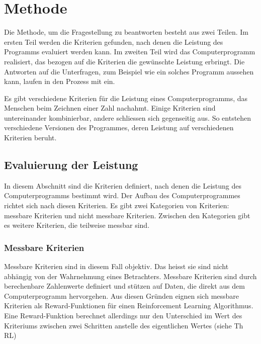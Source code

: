 \chapter{Methode}
Die Methode, um die Fragestellung zu beantworten besteht aus zwei Teilen. Im
ersten Teil werden die Kriterien gefunden, nach denen die Leistung des Programms
evaluiert werden kann. Im zweiten Teil wird das Computerprogramm realisiert, das
bezogen auf die Kriterien die gewünschte Leistung erbringt. Die Antworten auf
die Unterfragen, zum Beispiel wie ein solches Programm aussehen kann, laufen in
den Prozess mit ein. 

Es gibt verschiedene Kriterien für die Leistung eines Computerprogramms, das
Menschen beim Zeichnen einer Zahl nachahmt. Einige Kriterien sind untereinander
kombinierbar, andere schliessen sich gegenseitig aus. So entstehen verschiedene
Versionen des Programmes, deren Leistung auf verschiedenen Kriterien beruht.


\section{Evaluierung der Leistung}
In diesem Abschnitt sind die Kriterien definiert, nach denen die Leistung des
Computerprogramms bestimmt wird. Der Aufbau des Computerprogrammes richtet sich
nach diesen Kriterien. Es gibt zwei Kategorien von Kriterien: messbare Kriterien
und nicht messbare Kriterien. Zwischen den Kategorien gibt es weitere Kriterien,
die teilweise messbar sind.

\subsection*{Messbare Kriterien}
Messbare Kriterien sind in diesem Fall objektiv. Das heisst sie sind nicht
abhängig von der Wahrnehmung eines Betrachters. Messbare Kriterien sind durch
berechenbare Zahlenwerte definiert und stützen auf Daten, die direkt aus dem
Computerprogramm hervorgehen. Aus diesen Gründen eignen sich messbare Kriterien
als Reward-Funktionen für einen Reinforcement Learning Algorithmus. Eine
Reward-Funktion berechnet allerdings nur den Unterschied im Wert des Kriteriums
zwischen zwei Schritten anstelle des eigentlichen Wertes (siehe Th RL)

